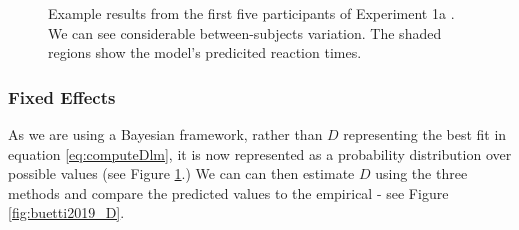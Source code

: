 \documentclass[smallextended]{svjour3}       %
\begin{document}
\begin{figure}
\centering
{}
\caption{Example results from the first five participants of Experiment 1a \cite{buetti2019predicting}. We can see considerable between-subjects variation. The shaded regions show the model's predicited reaction times.}
\label{fig:buetti2019_a1}
\end{figure}

\subsubsection{Fixed Effects}

As we are using a Bayesian framework, rather than $D$ representing the best fit in equation \ref{eq:computeDlm}, it is now represented as a probability distribution over possible values (see Figure \ref{fig:buetti2019_a1}.) We can can then estimate $D$ using the three methods and compare the predicted values to the empirical - see Figure \ref{fig:buetti2019_D}.
\end{document}
